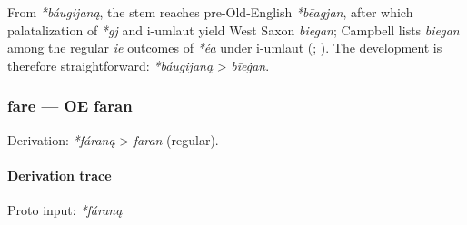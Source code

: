 \documentclass[
  british,
  a4paper,
]{article}
\begin{document}
From \emph{*báugijaną}, the stem reaches pre-Old-English
\emph{*bēagjan}, after which palatalization of \emph{*gj} and i-umlaut
yield West Saxon \emph{biegan}; Campbell lists \emph{biegan} among the
regular \emph{ie} outcomes of \emph{*éa} under i-umlaut
(;
). The development is
therefore straightforward: \emph{*báugijaną} \textgreater{}
\emph{bīeġan}.

\subsubsection{fare --- OE faran}\label{fare-oe-faran}

Derivation: \emph{*fáraną} \textgreater{} \emph{faran} (regular).

\paragraph{Derivation trace}\label{derivation-trace-5}

Proto input: \emph{*fáraną}

\begingroup
\setlength{\fboxsep}{6pt}
\end{document}
